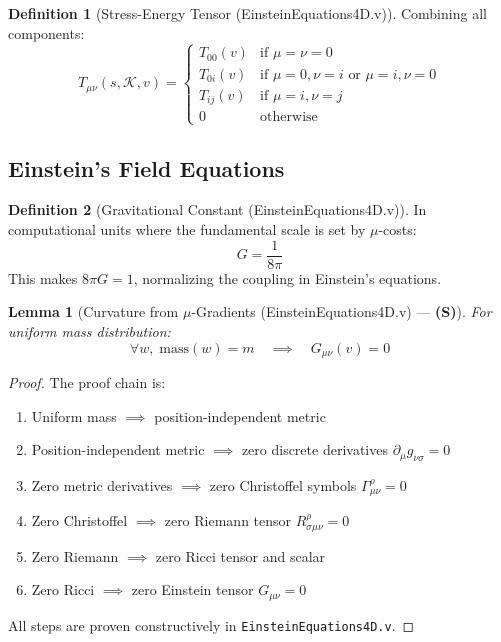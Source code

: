 \documentclass[11pt, a4paper]{report}
\theoremstyle{definition}
\newtheorem{definition}{Definition}[chapter]
\theoremstyle{plain}
\newtheorem{lemma}[theorem]{Lemma}
\begin{document}
\begin{definition}[Stress-Energy Tensor {\normalfont (EinsteinEquations4D.v)}]
Combining all components:
\begin{equation}
T_{\mu\nu}(s, \mathcal{K}, v) = \begin{cases}
T_{00}(v) & \text{if } \mu = \nu = 0 \\
T_{0i}(v) & \text{if } \mu = 0, \nu = i \text{ or } \mu = i, \nu = 0 \\
T_{ij}(v) & \text{if } \mu = i, \nu = j \\
0 & \text{otherwise}
\end{cases}
\end{equation}
\end{definition}

\subsection{Einstein's Field Equations}

\begin{definition}[Gravitational Constant {\normalfont (EinsteinEquations4D.v)}]
In computational units where the fundamental scale is set by $\mu$-costs:
\begin{equation}
G = \frac{1}{8\pi}
\end{equation}
This makes $8\pi G = 1$, normalizing the coupling in Einstein's equations.
\end{definition}

\begin{lemma}[Curvature from $\mu$-Gradients {\normalfont (EinsteinEquations4D.v)} --- \textbf{(S)}]
\label{lem:curvature_mu}
For uniform mass distribution:
\begin{equation}
\forall w,\; \text{mass}(w) = m \quad \implies \quad G_{\mu\nu}(v) = 0
\end{equation}
\end{lemma}

\begin{proof}
The proof chain is:
\begin{enumerate}
    \item Uniform mass $\implies$ position-independent metric
    \item Position-independent metric $\implies$ zero discrete derivatives $\partial_\mu g_{\nu\sigma} = 0$
    \item Zero metric derivatives $\implies$ zero Christoffel symbols $\Gamma^\rho_{\mu\nu} = 0$
    \item Zero Christoffel $\implies$ zero Riemann tensor $R^\rho_{\sigma\mu\nu} = 0$
    \item Zero Riemann $\implies$ zero Ricci tensor and scalar
    \item Zero Ricci $\implies$ zero Einstein tensor $G_{\mu\nu} = 0$
\end{enumerate}
All steps are proven constructively in \texttt{EinsteinEquations4D.v}.
\end{proof}
\end{document}
